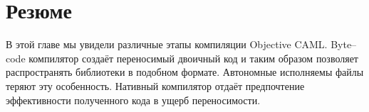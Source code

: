 \section{Резюме}
\label{sec:summary_7}

В этой главе мы увидели различные этапы компиляции Objective CAML. Byte--code
компилятор создаёт переносимый двоичный код и таким образом позволяет
распространять библиотеки в подобном формате. Автономные исполняемы файлы теряют
эту особенность. Нативный компилятор отдаёт предпочтение эффективности
полученного кода в ущерб переносимости.